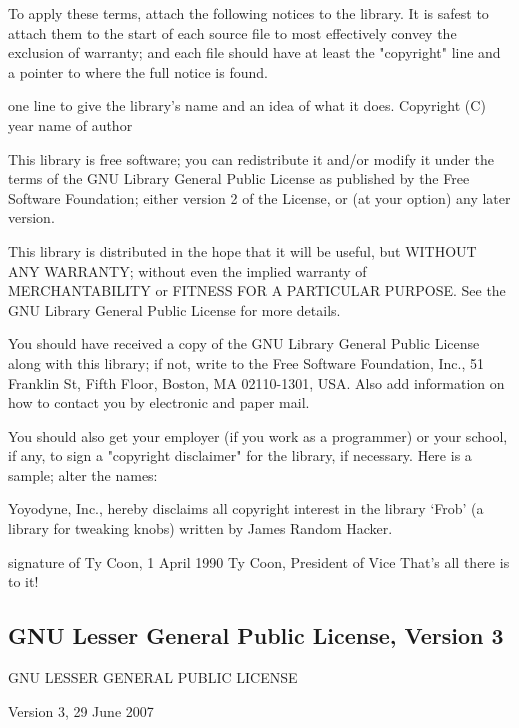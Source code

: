 To apply these terms, attach the following notices to the library. It is safest to attach them to the start of each source file to most effectively convey the exclusion of warranty; and each file should have at least the "copyright" line and a pointer to where the full notice is found. 

one line to give the library's name and an idea of what it does.
Copyright (C) year  name of author

This library is free software; you can redistribute it and/or
modify it under the terms of the GNU Library General Public
License as published by the Free Software Foundation; either
version 2 of the License, or (at your option) any later version.

This library is distributed in the hope that it will be useful,
but WITHOUT ANY WARRANTY; without even the implied warranty of
MERCHANTABILITY or FITNESS FOR A PARTICULAR PURPOSE.  See the GNU
Library General Public License for more details.

You should have received a copy of the GNU Library General Public
License along with this library; if not, write to the
Free Software Foundation, Inc., 51 Franklin St, Fifth Floor,
Boston, MA  02110-1301, USA.
Also add information on how to contact you by electronic and paper mail. 

You should also get your employer (if you work as a programmer) or your school, if any, to sign a "copyright disclaimer" for the library, if necessary. Here is a sample; alter the names: 

Yoyodyne, Inc., hereby disclaims all copyright interest in
the library `Frob' (a library for tweaking knobs) written
by James Random Hacker.

signature of Ty Coon, 1 April 1990
Ty Coon, President of Vice
That's all there is to it!



















\newpage
\subsection{GNU Lesser General Public License, Version 3}
\label{LGPLv3}
\begin{center}
	GNU LESSER GENERAL PUBLIC LICENSE
	
	Version 3, 29 June 2007
\end{center}

